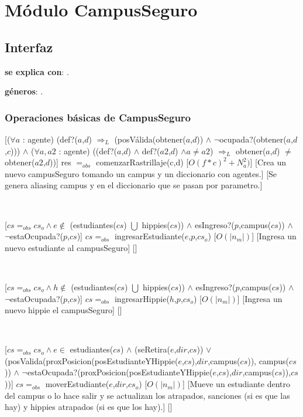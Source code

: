 \section{Módulo CampusSeguro}

\subsection{Interfaz}

\textbf{se explica con}: .

\textbf{géneros}: .

\subsubsection{Operaciones básicas de CampusSeguro}

[($\forall a$ : agente) (def?($a$,$d$) $\Rightarrow_L$ (posVálida(obtener($a$,$d$)) $\land$ $\neg$ocupada?(obtener($a$,$d$,$c$))) $\land$ ($\forall a, a2$ : agente) ((def?($a$,$d$) $\land$ def?($a2$,$d$) $\land a \neq a2$) $\Rightarrow_L$ obtener($a$,$d$) $\neq$ obtener($a2$,$d$))]
{res $=_{obs}$ comenzarRastrillaje(c,d)}
[$O(f*c)^2 + N_a^2)$]
[Crea un nuevo campusSeguro tomando un campus y un diccionario con agentes.]
[Se genera aliasing campus y en el diccionario que se pasan por parametro.]

~

[$cs =_{obs} cs_o \land e \not\in$ (estudiantes($cs$) $\bigcup$ hippies($cs$)) $\land$ esIngreso?($p$,campus($cs$)) $\land$ $\neg$estaOcupada?($p$,$cs$)]
{$cs =_{obs}$ ingresarEstudiante($e$,$p$,$cs_o$)}
[$O(|n_m|)$]
[Ingresa un nuevo estudiante al campusSeguro]
[]

~

[$cs =_{obs} cs_o \land h \not\in$ (estudiantes($cs$) $\bigcup$ hippies($cs$)) $\land$ esIngreso?($p$,campus($cs$)) $\land$ $\neg$estaOcupada?($p$,$cs$)]
{$cs =_{obs}$ ingresarHippie($h$,$p$,$cs_o$)}
[$O(|n_m|)$]
[Ingresa un nuevo hippie el campusSeguro]
[]

~

[$cs =_{obs} cs_o \land e \in$ estudiantes($cs$) $\land$ (seRetira($e$,$dir$,$cs$)) $\lor$ \\
(posValida(proxPosicion(posEstudianteYHippie($e$,$cs$),$dir$,campus($cs$)), campus($cs$)) $\land$ $\neg$estaOcupada?(proxPosicion(posEstudianteYHippie($e$,$cs$),$dir$,campus($cs$)),$cs$))]
{$cs =_{obs}$ moverEstudiante($e$,$dir$,$cs_o$)}
[$O(|n_m|)$]
[Mueve un estudiante dentro del campus o lo hace salir y se actualizan los atrapados, sanciones (si es que las hay) y hippies atrapados (si es que los hay).]
[]

